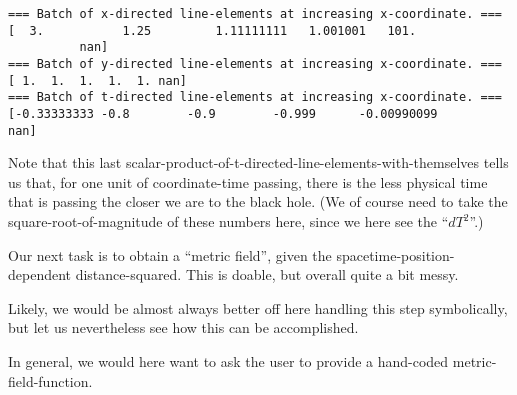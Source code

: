 \documentclass[11pt]{article}
\begin{document}
    \begin{Verbatim}[commandchars=\\\{\}]
=== Batch of x-directed line-elements at increasing x-coordinate. ===
[  3.           1.25         1.11111111   1.001001   101.
          nan]
=== Batch of y-directed line-elements at increasing x-coordinate. ===
[ 1.  1.  1.  1.  1. nan]
=== Batch of t-directed line-elements at increasing x-coordinate. ===
[-0.33333333 -0.8        -0.9        -0.999      -0.00990099         nan]
    \end{Verbatim}

    Note that this last
scalar-product-of-t-directed-line-elements-with-themselves tells us
that, for one unit of coordinate-time passing, there is the less
physical time that is passing the closer we are to the black hole. (We
of course need to take the square-root-of-magnitude of these numbers
here, since we here see the ``\(dT^2\)''.)

Our next task is to obtain a ``metric field'', given the
spacetime-position-dependent distance-squared. This is doable, but
overall quite a bit messy.

Likely, we would be almost always better off here handling this step
symbolically, but let us nevertheless see how this can be accomplished.

In general, we would here want to ask the user to provide a hand-coded
metric-field-function.
\end{document}
